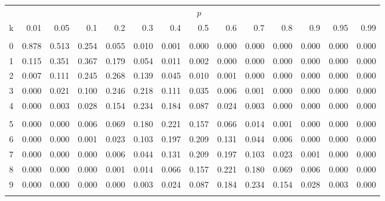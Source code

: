 \documentclass[
]{article}
\begin{document}
\begin{longtable}[t]{lrrrrrrrrrrrrr}
\toprule
\multicolumn{1}{c}{ } & \multicolumn{13}{c}{$p$} \\
\cmidrule(l{3pt}r{3pt}){2-14}
k & 0.01 & 0.05 & 0.1 & 0.2 & 0.3 & 0.4 & 0.5 & 0.6 & 0.7 & 0.8 & 0.9 & 0.95 & 0.99\\
\midrule
\addlinespace[0.3em]
\multicolumn{14}{l}{$n=13$}\\
\hspace{1em}0 & 0.878 & 0.513 & 0.254 & 0.055 & 0.010 & 0.001 & 0.000 & 0.000 & 0.000 & 0.000 & 0.000 & 0.000 & 0.000\\
\hspace{1em}1 & 0.115 & 0.351 & 0.367 & 0.179 & 0.054 & 0.011 & 0.002 & 0.000 & 0.000 & 0.000 & 0.000 & 0.000 & 0.000\\
\hspace{1em}2 & 0.007 & 0.111 & 0.245 & 0.268 & 0.139 & 0.045 & 0.010 & 0.001 & 0.000 & 0.000 & 0.000 & 0.000 & 0.000\\
\hspace{1em}3 & 0.000 & 0.021 & 0.100 & 0.246 & 0.218 & 0.111 & 0.035 & 0.006 & 0.001 & 0.000 & 0.000 & 0.000 & 0.000\\
\hspace{1em}4 & 0.000 & 0.003 & 0.028 & 0.154 & 0.234 & 0.184 & 0.087 & 0.024 & 0.003 & 0.000 & 0.000 & 0.000 & 0.000\\
\addlinespace[-.7em]
\multicolumn{14}{l}{ }\\
\hspace{1em}5 & 0.000 & 0.000 & 0.006 & 0.069 & 0.180 & 0.221 & 0.157 & 0.066 & 0.014 & 0.001 & 0.000 & 0.000 & 0.000\\
\hspace{1em}6 & 0.000 & 0.000 & 0.001 & 0.023 & 0.103 & 0.197 & 0.209 & 0.131 & 0.044 & 0.006 & 0.000 & 0.000 & 0.000\\
\hspace{1em}7 & 0.000 & 0.000 & 0.000 & 0.006 & 0.044 & 0.131 & 0.209 & 0.197 & 0.103 & 0.023 & 0.001 & 0.000 & 0.000\\
\hspace{1em}8 & 0.000 & 0.000 & 0.000 & 0.001 & 0.014 & 0.066 & 0.157 & 0.221 & 0.180 & 0.069 & 0.006 & 0.000 & 0.000\\
\hspace{1em}9 & 0.000 & 0.000 & 0.000 & 0.000 & 0.003 & 0.024 & 0.087 & 0.184 & 0.234 & 0.154 & 0.028 & 0.003 & 0.000\\
\addlinespace[-.7em]
\multicolumn{14}{l}{ }\\

\end{longtable}
\end{document}
